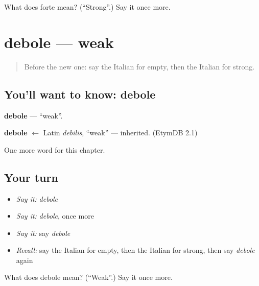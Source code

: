 \begin{tcolorbox}[breakable,colback=teal!4,colframe=teal!35!black,title={Before you move on}]
What does forte mean? (\textquotedblleft{}Strong\textquotedblright{}.) Say it once more.
\end{tcolorbox}
\section[debole]{debole — weak}

\label{lesson:IT-C76-debole}



\begin{quote}
Before the new one: say the Italian for empty, then the Italian for strong.
\end{quote}

\subsection*{You'll want to know: debole}
\textbf{debole} — \textquotedblleft{}weak\textquotedblright{}.

\begin{cousinweb}
\textbf{debole} $\leftarrow$ Latin \emph{debilis}, \textquotedblleft{}weak\textquotedblright{} — inherited. (EtymDB 2.1)
\end{cousinweb}

\begin{grammarlens}[title={What you've built}]
One more word for this chapter.
\end{grammarlens}

\subsection*{Your turn}
\begin{itemize}
\raggedright
  \item \emph{Say it:} \emph{debole}
  \item \emph{Say it:} \emph{debole}, once more
  \item \emph{Say it:} say \emph{debole}
  \item \emph{Recall:} say the Italian for empty, then the Italian for strong, then say \emph{debole} again
\end{itemize}

\begin{tcolorbox}[breakable,colback=teal!4,colframe=teal!35!black,title={Before you move on}]
What does debole mean? (\textquotedblleft{}Weak\textquotedblright{}.) Say it once more.
\end{tcolorbox}
